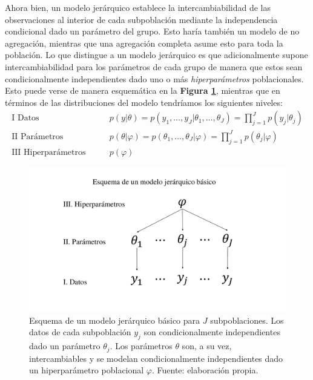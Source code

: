 Ahora bien, un modelo jerárquico establece la intercambiabilidad de las observaciones al interior de cada subpoblación mediante la independencia condicional dado un parámetro del grupo. Esto haría también un modelo de no agregación, mientras que una agregación completa asume esto para toda la población. Lo que distingue a un modelo jerárquico es que adicionalmente supone intercambiabilidad para los parámetros de cada grupo de manera que estos sean condicionalmente independientes dado uno o más \textit{hiperparámetros} poblacionales. Esto puede verse de manera esquemática en la \textbf{Figura \ref{fig:Esquema_Modelo_Jer}}, mientras que en términos de las distribuciones del modelo tendríamos los siguientes niveles: 
\begin{align} \label{eq:Esquema_Modelo_Jer}	
\text{I Datos} \qquad & p(y|\theta)=p(y_1,\dots,y_J|\theta_1,\dots,\theta_J)=\prod\limits_{j=1}^Jp(y_j|\theta_j) \nonumber \\
\text{II Parámetros} \qquad & p(\theta|\varphi)=p(\theta_1,\dots,\theta_J|\varphi) = \prod\limits_{j=1}^Jp(\theta_j|\varphi) \nonumber \\
\text{III Hiperparámetros} \qquad & p(\varphi)
\end{align}

\begin{figure}[h]
	\centering
	\includegraphics[scale=0.25]{Figs/Bayes/Modelo_Jer}
	\caption{Esquema de un modelo jerárquico básico para $J$ subpoblaciones. Los datos de cada subpoblación $y_j$ son condicionalmente independientes dado un parámetro $\theta_j$. Los parámetros $\theta$ son, a su vez, intercambiables y se modelan condicionalmente independientes dado un hiperparámetro poblacional $\varphi$. Fuente: elaboración propia.}
	\label{fig:Esquema_Modelo_Jer}	
\end{figure}

